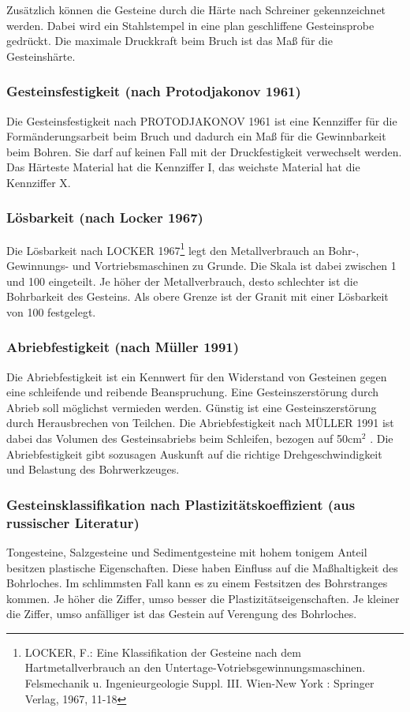 \documentclass[12pt,a4paper,draft]{scrartcl} %
\begin{document}
Zusätzlich können die Gesteine durch die Härte nach Schreiner gekennzeichnet werden. Dabei wird ein Stahlstempel in eine plan geschliffene Gesteinsprobe gedrückt. Die maximale Druckkraft beim Bruch ist das Maß für die Gesteinshärte.
\subsubsection{Gesteinsfestigkeit (nach Protodjakonov 1961)}
Die Gesteinsfestigkeit nach PROTODJAKONOV 1961 ist eine Kennziffer für die Formänderungsarbeit beim Bruch und dadurch ein Maß für die Gewinnbarkeit beim Bohren. Sie darf auf keinen Fall mit der Druckfestigkeit verwechselt werden. Das Härteste Material hat die Kennziffer I, das weichste Material hat die Kennziffer X.
\subsubsection{Lösbarkeit (nach Locker 1967)}
Die Lösbarkeit nach LOCKER 1967\footnote{LOCKER, F.: Eine Klassifikation der Gesteine nach dem Hartmetallverbrauch an den Untertage-Votriebsgewinnungsmaschinen. Felsmechanik u. Ingenieurgeologie Suppl. III. Wien-New York : Springer Verlag, 1967, 11-18} legt den Metallverbrauch an Bohr-, Gewinnungs- und Vortriebsmaschinen zu Grunde. Die Skala ist dabei zwischen 1 und 100 eingeteilt. Je höher der Metallverbrauch, desto schlechter ist die Bohrbarkeit des Gesteins. Als obere Grenze ist der Granit mit einer Lösbarkeit von 100 festgelegt.

\subsubsection{Abriebfestigkeit (nach Müller 1991)}
Die Abriebfestigkeit ist ein Kennwert für den Widerstand von Gesteinen gegen eine schleifende und reibende Beanspruchung. Eine Gesteinszerstörung durch Abrieb soll möglichst vermieden werden. Günstig ist eine Gesteinszerstörung durch Herausbrechen von Teilchen. Die Abriebfestigkeit nach MÜLLER 1991 ist dabei das Volumen des Gesteinsabriebs beim Schleifen, bezogen auf 50cm$^2$ . Die Abriebfestigkeit gibt sozusagen Auskunft auf die richtige Drehgeschwindigkeit und Belastung des Bohrwerkzeuges.
\subsubsection{Gesteinsklassifikation nach Plastizitätskoeffizient (aus russischer Literatur)}
Tongesteine, Salzgesteine und Sedimentgesteine mit hohem tonigem Anteil besitzen plastische Eigenschaften. Diese haben Einfluss auf die Maßhaltigkeit des Bohrloches. Im schlimmsten Fall kann es zu einem Festsitzen des Bohrstranges kommen. Je höher die Ziffer, umso besser die Plastizitätseigenschaften. Je kleiner die Ziffer, umso anfälliger ist das Gestein auf Verengung des Bohrloches.
\end{document}
